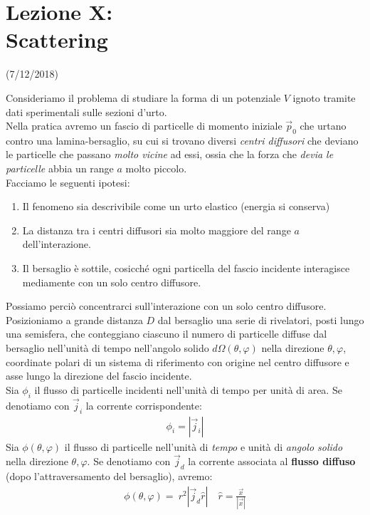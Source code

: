 \documentclass[../../FisicaTeorica.tex]{subfiles}
\begin{document}
\section{Lezione X:\\ \large{Scattering}}
\vspace{-1em}
\begin{center}
    \small{(7/12/2018)}
\end{center}

Consideriamo il problema di studiare la forma di un potenziale $V$ ignoto tramite dati sperimentali sulle sezioni d'urto.\\

Nella pratica avremo un fascio di particelle di momento iniziale $\vec{p}_0$ che urtano contro una lamina-bersaglio, su cui si trovano diversi \textit{centri diffusori} che deviano le particelle che passano \textit{molto vicine} ad essi, ossia che la forza che \textit{devia le particelle} abbia un range $a$ molto piccolo.\\
Facciamo le seguenti ipotesi:
\begin{enumerate}
\item Il fenomeno sia descrivibile come un urto elastico (energia si conserva)
\item La distanza tra i centri diffusori sia molto maggiore del range $a$ dell'interazione.
\item Il bersaglio è sottile, cosicché ogni particella del fascio incidente interagisce mediamente con un solo centro diffusore.
\end{enumerate}
Possiamo perciò concentrarci sull'interazione con un solo centro diffusore.\\
Posizioniamo a grande distanza $D$ dal bersaglio una serie di rivelatori, posti lungo una semisfera, che conteggiano ciascuno il numero di particelle diffuse dal bersaglio nell'unità di tempo nell'angolo solido $d\Omega(\theta,\varphi)$ nella direzione $\theta,\varphi$, coordinate polari di un sistema di riferimento con origine nel centro diffusore e asse lungo la direzione del fascio incidente.\\
Sia $\phi_i$ il flusso di particelle incidenti nell'unità di tempo per unità di area. Se denotiamo con $\vec{j}_i$ la corrente corrispondente:
\begin{align*}
\phi_i = |\vec{j}_i|
\end{align*}
Sia $\phi(\theta,\varphi)$ il flusso di particelle nell'unità di \textit{tempo} e unità di \textit{angolo solido} nella direzione $\theta,\varphi$. Se denotiamo con $\vec{j}_d$ la corrente associata al \textbf{flusso diffuso} (dopo l'attraversamento del bersaglio), avremo:
\begin{align*}
\phi(\theta,\varphi) =\ r^2 |\vec{j}_{d} \hat{r}|\quad \hat{r} = \frac{\vec{x}}{|\vec{x}|}
\end{align*}
\end{document}
